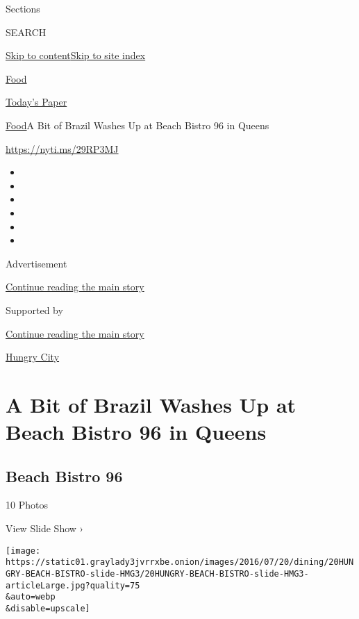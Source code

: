 Sections

SEARCH

\protect\hyperlink{site-content}{Skip to
content}\protect\hyperlink{site-index}{Skip to site index}

\href{https://www.nytimes3xbfgragh.onion/section/food}{Food}

\href{https://myaccount.nytimes3xbfgragh.onion/auth/login?response_type=cookie\&client_id=vi}{}

\href{https://www.nytimes3xbfgragh.onion/section/todayspaper}{Today's
Paper}

\href{/section/food}{Food}\textbar{}A Bit of Brazil Washes Up at Beach
Bistro 96 in Queens

\url{https://nyti.ms/29RP3MJ}

\begin{itemize}
\item
\item
\item
\item
\item
\item
\end{itemize}

Advertisement

\protect\hyperlink{after-top}{Continue reading the main story}

Supported by

\protect\hyperlink{after-sponsor}{Continue reading the main story}

\href{/column/hungry-city}{Hungry City}

\hypertarget{a-bit-of-brazil-washes-up-at-beach-bistro-96-in-queens}{%
\section{A Bit of Brazil Washes Up at Beach Bistro 96 in
Queens}\label{a-bit-of-brazil-washes-up-at-beach-bistro-96-in-queens}}

\href{https://www.nytimes3xbfgragh.onion/slideshow/2016/07/20/dining/beach-bistro-96-review.html}{}

\hypertarget{beach-bistro-96}{%
\subsection{Beach Bistro 96}\label{beach-bistro-96}}

10 Photos

View Slide Show ›

\texttt{[image: https://static01.graylady3jvrrxbe.onion/images/2016/07/20/dining/20HUNGRY-BEACH-BISTRO-slide-HMG3/20HUNGRY-BEACH-BISTRO-slide-HMG3-articleLarge.jpg?quality=75\\\&auto=webp\\\&disable=upscale]}

